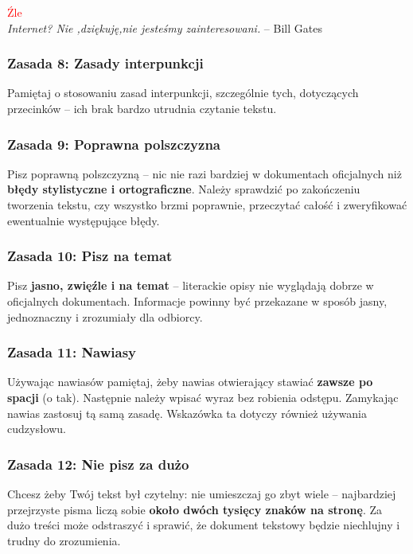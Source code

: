\documentclass[11pt,polish]{article}
\begin{document}
  \textcolor{red}{Źle} \\
  \indent \emph{Internet? Nie ,dziękuję,nie jesteśmy zainteresowani.} – Bill Gates\\

\subsubsection{Zasada 8: Zasady interpunkcji}
  Pamiętaj o stosowaniu zasad interpunkcji, szczególnie tych, dotyczących przecinków – ich brak bardzo utrudnia czytanie tekstu.

\subsubsection{Zasada 9: Poprawna polszczyzna}
  Pisz poprawną polszczyzną – nic nie razi bardziej w dokumentach oficjalnych niż \textbf{błędy stylistyczne i ortograficzne}. Należy sprawdzić po zakończeniu tworzenia tekstu, czy wszystko brzmi poprawnie, przeczytać całość i zweryfikować ewentualnie występujące błędy.

\subsubsection{Zasada 10: Pisz na temat}
  Pisz \textbf{jasno, zwięźle i na temat} – literackie opisy nie wyglądają dobrze w oficjalnych dokumentach. Informacje powinny być przekazane w sposób jasny, jednoznaczny i zrozumiały dla odbiorcy.

\subsubsection{Zasada 11: Nawiasy}
  Używając nawiasów pamiętaj, żeby nawias otwierający stawiać \textbf{zawsze po spacji} (o tak). Następnie należy wpisać wyraz bez robienia odstępu. Zamykając nawias zastosuj tą samą zasadę. Wskazówka ta dotyczy również używania cudzysłowu.

\newpage

\subsubsection{Zasada 12: Nie pisz za dużo}
  Chcesz żeby Twój tekst był czytelny: nie umieszczaj go zbyt wiele – najbardziej przejrzyste pisma liczą sobie \textbf{około dwóch tysięcy znaków na stronę}. Za dużo treści może odstraszyć i sprawić, że dokument tekstowy będzie niechlujny i trudny do zrozumienia.
\end{document}
